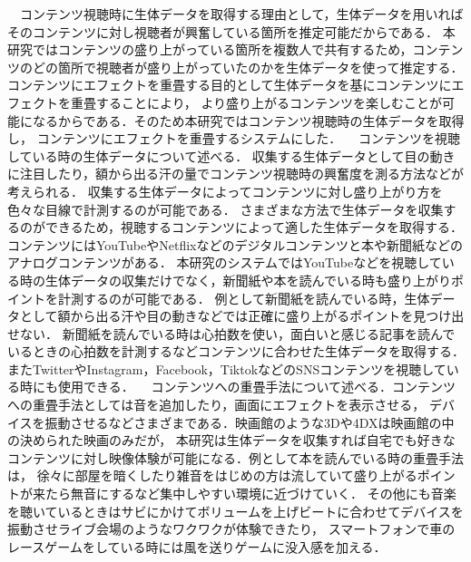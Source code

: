 　コンテンツ視聴時に生体データを取得する理由として，生体データを用いればそのコンテンツに対し視聴者が興奮している箇所を推定可能だからである．
本研究ではコンテンツの盛り上がっている箇所を複数人で共有するため，コンテンツのどの箇所で視聴者が盛り上がっていたのかを生体データを使って推定する．
コンテンツにエフェクトを重畳する目的として生体データを基にコンテンツにエフェクトを重畳することにより，
より盛り上がるコンテンツを楽しむことが可能になるからである．そのため本研究ではコンテンツ視聴時の生体データを取得し，
コンテンツにエフェクトを重畳するシステムにした．
　コンテンツを視聴している時の生体データについて述べる．
収集する生体データとして目の動きに注目したり，額から出る汗の量でコンテンツ視聴時の興奮度を測る方法などが考えられる．
収集する生体データによってコンテンツに対し盛り上がり方を色々な目線で計測するのが可能である．
さまざまな方法で生体データを収集するのができるため，視聴するコンテンツによって適した生体データを取得する．
コンテンツにはYouTubeやNetflixなどのデジタルコンテンツと本や新聞紙などのアナログコンテンツがある．
本研究のシステムではYouTubeなどを視聴している時の生体データの収集だけでなく，新聞紙や本を読んでいる時も盛り上がりポイントを計測するのが可能である．
例として新聞紙を読んでいる時，生体データとして額から出る汗や目の動きなどでは正確に盛り上がるポイントを見つけ出せない．
新聞紙を読んでいる時は心拍数を使い，面白いと感じる記事を読んでいるときの心拍数を計測するなどコンテンツに合わせた生体データを取得する．
またTwitterやInstagram，Facebook，TiktokなどのSNSコンテンツを視聴している時にも使用できる．
　コンテンツへの重畳手法について述べる．コンテンツへの重畳手法としては音を追加したり，画面にエフェクトを表示させる，
デバイスを振動させるなどさまざまである．映画館のような3Dや4DXは映画館の中の決められた映画のみだが，
本研究は生体データを収集すれば自宅でも好きなコンテンツに対し映像体験が可能になる．例として本を読んでいる時の重畳手法は，
徐々に部屋を暗くしたり雑音をはじめの方は流していて盛り上がるポイントが来たら無音にするなど集中しやすい環境に近づけていく．
その他にも音楽を聴いているときはサビにかけてボリュームを上げビートに合わせてデバイスを振動させライブ会場のようなワクワクが体験できたり，
スマートフォンで車のレースゲームをしている時には風を送りゲームに没入感を加える．

